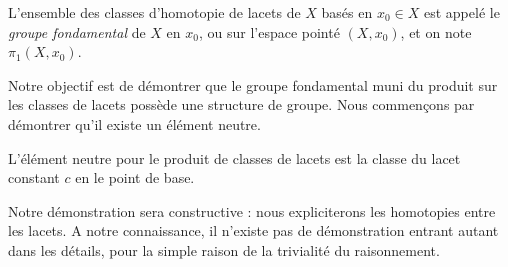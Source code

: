 \begin{definition}
L'ensemble des classes d'homotopie de lacets de $X$ basés en $x_0\in X$ est appelé le \emph{groupe fondamental} de $X$ en $x_0$, ou sur l'espace pointé $(X,x_0)$, et on note $\pi_1(X,x_0)$.
\end{definition}

Notre objectif est de démontrer que le groupe fondamental muni du produit sur les classes de lacets possède une structure de groupe. Nous commençons par démontrer qu'il existe un élément neutre.

\begin{lemma}
L'élément neutre pour le produit de classes de lacets est la classe du lacet constant $c$ en le point de base.
\end{lemma}

Notre démonstration sera constructive : nous expliciterons les homotopies entre les lacets. A notre connaissance, il n'existe pas de démonstration entrant autant dans les détails, pour la simple raison de la trivialité du raisonnement.

